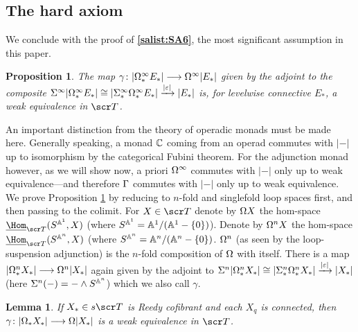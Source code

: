 \documentclass{amsart}
\newtheorem{prop}[thm]{Proposition}
\newtheorem{lem}[thm]{Lemma}
\theoremstyle{definition}
\begin{document}
\subsection{The hard axiom}\label{subsec:simpobhard}
We conclude with the proof of \textbf{\ref{salist:SA6}}, the most significant assumption in this paper. 
\begin{prop}\label{prop:3.5}
The map $\gamma \colon |\Omega^{\infty}_* E_*| \longrightarrow \Omega^{\infty}|E_*|$ given by the adjoint to the composite $\Sigma^{\infty}|\Omega^{\infty}_*E_*| \cong |\Sigma^{\infty}_* \Omega^{\infty}_* E_*| \xrightarrow{|\varepsilon|} |E_*|$ is, for levelwise connective $E_*$, a weak equivalence in $\sT$.
\end{prop}

An important distinction from the theory of operadic monads must be made here. Generally speaking, a monad $\mathbb{C}$ coming from an operad commutes with $|-|$ up to isomorphism by the categorical Fubini theorem. For the adjunction monad however, as we will show now, a priori $\Omega^{\infty}$ commutes with $|-|$ only up to weak equivalence---and therefore $\Gamma$ commutes with $|-|$ only up to weak equivalence.\\

We prove Proposition \ref{prop:3.5} by reducing to $n$-fold and singlefold loop spaces first, and then passing to the colimit. For $X \in \sT$ denote by $\Omega X$ the hom-space $\underline{\Hom}_{\sT}(S^{\bA^1},X)$ (where $S^{\mathbb{A}^1} = \mathbb{A}^1/(\mathbb{A}^1 - \{0\})$). Denote by $\Omega^n X$ the hom-space $\underline{\Hom}_{\sT}(S^{\bA^n},X)$ (where $S^{\mathbb{A}^n} = \mathbb{A}^n/(\mathbb{A}^n-\{0\})$. $\Omega^n$ (as seen by the loop-suspension adjunction) is the $n$-fold composition of $\Omega$ with itself. There is a map $|\Omega^n_* X_*| \longrightarrow \Omega^n|X_*|$ again given by the adjoint to $\Sigma^n|\Omega^n_* X_*| \cong |\Sigma^n_*\Omega^n_* X_*| \xrightarrow{|\varepsilon|} |X_*|$ (here $\Sigma^n(-) = - \wedge S^{\mathbb{A}^n}$) which we also call $\gamma$.

\begin{lem}\label{lem:3.1}
If $X_* \in s\sT$ is Reedy cofibrant and each $X_q$ is connected, then $\gamma \colon |\Omega_* X_*| \longrightarrow \Omega|X_*|$ is a weak equivalence in $\sT$.
\end{lem}
\end{document}
